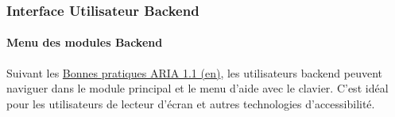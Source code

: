 %

\begin{frame}[fragile]
	\frametitle{Interface Utilisateur Backend}
	\framesubtitle{Menu des modules Backend}

	Suivant les
	\href{https://www.w3.org/TR/wai-aria-practices-1.1/}{Bonnes pratiques ARIA 1.1 (en)},
	les utilisateurs backend peuvent naviguer dans le module principal et le menu d'aide
	avec le clavier. C'est idéal pour les utilisateurs de lecteur d'écran et autres
	technologies d'accessibilité.


\end{frame}

